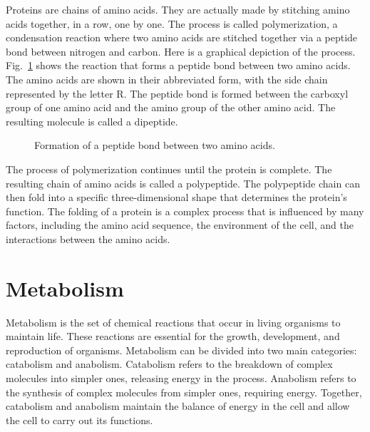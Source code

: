 Proteins are chains of amino acids. They are actually made by stitching amino acids together, in a row, one by one. The process is called polymerization, a condensation reaction where two amino acids are stitched together via a peptide bond between nitrogen and carbon. Here is a graphical depiction of the process. Fig.~\ref{fig:peptide-bond} shows the reaction that forms a peptide bond between two amino acids. The amino acids are shown in their abbreviated form, with the side chain represented by the letter R. The peptide bond is formed between the carboxyl group of one amino acid and the amino group of the other amino acid. The resulting molecule is called a dipeptide.

\begin{figure}
    \caption[6pt]{Formation of a peptide bond between two amino acids.}
    \label{fig:peptide-bond}
\end{figure}

The process of polymerization continues until the protein is complete. The resulting chain of amino acids is called a polypeptide. The polypeptide chain can then fold into a specific three-dimensional shape that determines the protein's function. The folding of a protein is a complex process that is influenced by many factors, including the amino acid sequence, the environment of the cell, and the interactions between the amino acids.

\section{Metabolism}

Metabolism is the set of chemical reactions that occur in living organisms to maintain life. These reactions are essential for the growth, development, and reproduction of organisms. Metabolism can be divided into two main categories: catabolism and anabolism. Catabolism refers to the breakdown of complex molecules into simpler ones, releasing energy in the process. Anabolism refers to the synthesis of complex molecules from simpler ones, requiring energy. Together, catabolism and anabolism maintain the balance of energy in the cell and allow the cell to carry out its functions.

